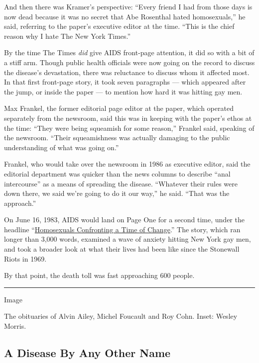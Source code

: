 And then there was Kramer's perspective: ``Every friend I had from those
days is now dead because it was no secret that Abe Rosenthal hated
homosexuals,'' he said, referring to the paper's executive editor at the
time. ``This is the chief reason why I hate The New York Times.''

By the time The Times \emph{did} give AIDS front-page attention, it did
so with a bit of a stiff arm. Though public health officials were now
going on the record to discuss the disease's devastation, there was
reluctance to discuss whom it affected most. In that first front-page
story, it took seven paragraphs --- which appeared after the jump, or
inside the paper --- to mention how hard it was hitting gay men.

Max Frankel, the former editorial page editor at the paper, which
operated separately from the newsroom, said this was in keeping with the
paper's ethos at the time: ``They were being squeamish for some
reason,'' Frankel said, speaking of the newsroom. ``Their squeamishness
was actually damaging to the public understanding of what was going
on.''

Frankel, who would take over the newsroom in 1986 as executive editor,
said the editorial department was quicker than the news columns to
describe ``anal intercourse'' as a means of spreading the disease.
``Whatever their rules were down there, we said we're going to do it our
way,'' he said. ``That was the approach.''

On June 16, 1983, AIDS would land on Page One for a second time, under
the headline
``\href{https://www.nytimes.com/1983/06/16/nyregion/homosexuals-confronting-a-time-of-change.html}{Homosexuals
Confronting a Time of Change}.'' The story, which ran longer than 3,000
words, examined a wave of anxiety hitting New York gay men, and took a
broader look at what their lives had been like since the Stonewall Riots
in 1969.

By that point, the death toll was fast approaching 600 people.

\begin{center}\rule{0.5\linewidth}{\linethickness}\end{center}

Image

The obituaries of Alvin Ailey, Michel Foucault and Roy Cohn. Inset:
Wesley Morris.

\hypertarget{a-disease-by-any-other-name}{%
\subsection{A Disease By Any Other
Name}\label{a-disease-by-any-other-name}}

